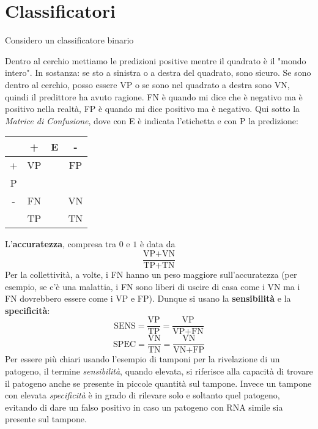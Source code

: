 \documentclass[11pt]{report}
\begin{document}
\section{Classificatori}
Considero un classificatore binario
\begin{center}
\end{center}
Dentro al cerchio mettiamo le predizioni positive mentre il quadrato è il "mondo intero". In sostanza: se sto a sinistra o a destra del quadrato, sono sicuro. Se sono dentro al cerchio, posso essere VP o se sono nel quadrato a destra sono VN, quindi il predittore ha avuto ragione. FN è quando mi dice che è negativo ma è positivo nella realtà, FP è quando mi dice positivo ma è negativo. Qui sotto la \textit{Matrice di Confusione}, dove con E è indicata l'etichetta e con P la predizione:
\begin{center}
    \begin{tabular}{ c| c c c }
    & + & E & - \\
    \hline
    + & VP & & FP \\
    P \\
    - & FN & & VN \\
    \hline
    & TP & & TN
    \end{tabular}
\end{center}
L'\textbf{accuratezza}, compresa tra $0$ e $1$ è data da
$$\frac{\text{VP} + \text{VN}}{\text{TP} + \text{TN}}$$
Per la collettività, a volte, i FN hanno un peso maggiore sull'accuratezza (per esempio, se c'è una malattia, i FN sono liberi di uscire di casa come i VN ma i FN dovrebbero essere come i VP e FP). Dunque si usano la \textbf{sensibilità} e la \textbf{specificità}:
$$\text{SENS} = \frac{\text{VP}}{\text{TP}} = \frac{\text{VP}}{\text{VP} + \text{FN}}$$
$$\text{SPEC} = \frac{\text{VN}}{\text{TN}} = \frac{\text{VN}}{\text{VN} + \text{FP}}$$
Per essere più chiari usando l'esempio di tamponi per la rivelazione di un patogeno, il termine \textit{sensibilità}, quando elevata, si riferisce alla capacità di trovare il patogeno anche se presente in piccole quantità sul tampone. Invece un tampone con elevata \textit{specificità} è in grado di rilevare solo e soltanto quel patogeno, evitando di dare un falso positivo in caso un patogeno con RNA simile sia presente sul tampone.
\end{document}
